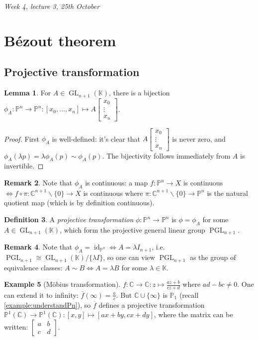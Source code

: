 \documentclass{article}
\newcommand{\C}{\mathbb{C}}
\newcommand{\K}{\mathbb{K}}
\newcommand{\p}{\mathbb{P}}
\newcommand{\id}{\operatorname{id}}
\newcommand{\GL}{\operatorname{GL}}
\newcommand{\PGL}{\operatorname{PGL}}
\theoremstyle{definition}
\newtheorem{defn}{Definition}[subsection]
\newtheorem{lemma}[defn]{Lemma}
\newtheorem{example}[defn]{Example}
\newtheorem{remark}[defn]{Remark}
\begin{document}
\begin{flushright}
\textit{Week 4, lecture 3, 25th October}
\end{flushright}

\section{Bézout theorem}
\subsection{Projective transformation}
\begin{lemma}
For $A\in\GL_{n+1}(\K)$, there is a bijection $\phi_A:\p^n\rightarrow\p^n:[x_0,\ldots,x_n]\mapsto A\begin{bmatrix}x_0\\ \vdots \\ x_n\end{bmatrix}$.
\end{lemma}
\begin{proof}
First $\phi_A$ is well-defined: it's clear that $A\begin{bmatrix}x_0\\ \vdots \\ x_n\end{bmatrix}$ is never zero, and $\phi_A(\lambda p)=\lambda \phi_A(p)\sim\phi_A(p)$. The bijectivity follows immediately from $A$ is invertible.
\end{proof}
\begin{remark}
Note that $\phi_A$ is continuous: a map $f:\p^n\rightarrow X$ is continuous $\iff f\circ\pi:\C^{n+1}\backslash\{0\}\rightarrow X$ is continuous where $\pi:\C^{n+1}\backslash\{0\}\rightarrow\p^n$ is the natural quotient map (which is by definition continuous).
\end{remark}

\begin{defn}
A \textit{projective transformation} $\phi:\p^n\rightarrow\p^n$ is $\phi=\phi_A$ for some $A\in\GL_{n+1}(\K)$, which form the projective general linear group $\PGL_{n+1}$.
\end{defn}
\begin{remark}
Note that $\phi_A=\id_{\p^n}\iff A=\lambda I_{n+1}$, i.e. $\PGL_{n+1}\cong\GL_{n+1}(\K)/\{\lambda I\}$, so one can view $\PGL_{n+1}$ as the group of equivalence classes: $A\sim B\iff A=\lambda B$ for some $\lambda\in\K$.
\end{remark}

\begin{example}[Möbius transformation]
$f:\C\rightarrow\C:z\mapsto\frac{az+b}{cz+d}$ where $ad-bc\neq 0$. One can extend it to infinity: $\overline f(\infty)=\frac{a}{c}$. But $\C\cup\{\infty\}$ is $\p_1$ (recall \ref{example:understandPn}), so $\overline f$ defines a projective transformation $\p^1(\C)\rightarrow\p^1(\C):[x,y]\mapsto\left[ax+by,cx+dy\right]$, where the matrix can be written: $\begin{bmatrix}a&b\\c&d\end{bmatrix}$.
\end{example}
\end{document}
